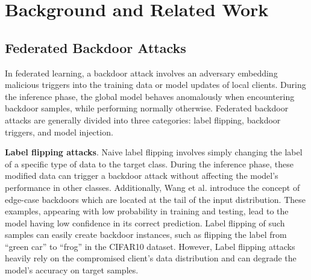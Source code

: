 \section{Background and Related Work}
\label{Sec2}

\subsection{Federated Backdoor Attacks}\label{Sec2.2}

In federated learning, a backdoor attack involves an adversary embedding malicious triggers into the training data or model updates of local clients. During the inference phase, the global model behaves anomalously when encountering backdoor samples, while performing normally otherwise. Federated backdoor attacks are generally divided into three categories: label flipping, backdoor triggers, and model injection.

\textbf{Label flipping attacks}. Naive label flipping \cite{R4} involves simply changing the label of a specific type of data to the target class. During the inference phase, these modified data can trigger a backdoor attack without affecting the model’s performance in other classes. Additionally, Wang et al. \cite{R6} introduce the concept of edge-case backdoors which are located at the tail of the input distribution. These examples, appearing with low probability in training and testing, lead to the model having low confidence in its correct prediction. Label flipping of such samples can easily create backdoor instances, such as flipping the label from “green car” to “frog” in the CIFAR10 dataset. However, Label flipping attacks heavily rely on the compromised client's data distribution and can degrade the model's accuracy on target samples.

